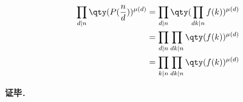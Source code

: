 \begin{equation}
\begin{aligned}
\prod_{d\mid n}\qty(P(\frac{n}{d}))^{\mu(d)}&=\prod_{d\mid n}\qty(\prod_{dk\mid n}f(k))^{\mu(d)}\\
&=\prod_{d\mid n}\prod_{dk\mid n}\qty(f(k))^{\mu(d)}\\
&=\prod_{k\mid n}\prod_{dk\mid n}\qty(f(k))^{\mu(d)}\\
\end{aligned}
\end{equation}

\textbf{证毕}．

















